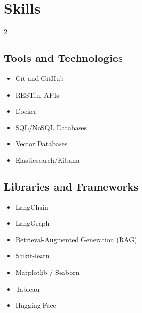 \documentclass[a4paper,12pt]{article}
\begin{document}
\section{Skills}
\begin{multicols}{2}
    \subsection*{Tools and Technologies}
    \begin{itemize}[nosep, leftmargin=1.5em]
        \item Git and GitHub
        \item RESTful APIs
        \item Docker
        \item SQL/NoSQL Databases
        \item Vector Databases
        \item Elasticsearch/Kibana

    \end{itemize}

    \subsection*{Libraries and Frameworks}
    \begin{itemize}[nosep, leftmargin=1.5em]
        \item LangChain
        \item LangGraph
        \item Retrieval-Augmented Generation (RAG)
        \item Scikit-learn
        \item Matplotlib / Seaborn
        \item Tableau
        \item Hugging Face

    \end{itemize}

    
\end{multicols}
\newpage
\end{document}
